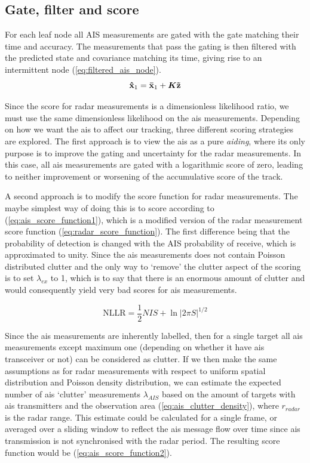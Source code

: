 \subsection{Gate, filter and score}\label{sec:ais_gate_filter_score}
For each leaf node all AIS measurements are gated with the gate matching their time and accuracy. The measurements that pass the gating is then filtered with the predicted state and covariance matching its time, giving rise to an intermittent node (\ref{eq:filtered_ais_node}).
\begin{equation}\label{eq:filtered_ais_node}
\boldsymbol{\mathbf{\hat{x}}}_1 = \boldsymbol{\mathbf{\bar{x}}}_1 + \bm{K} \boldsymbol{\mathbf{\tilde{z}}}
\end{equation}

Since the score for radar measurements is a dimensionless likelihood ratio, we must use the same dimensionless likelihood on the \gls{ais} measurements. Depending on how we want the \gls{ais} to affect our tracking, three different scoring strategies are explored. The first approach is to view the \gls{ais} as a pure \emph{aiding}, where its only purpose is to improve the gating and uncertainty for the radar measurements. In this case, all \gls{ais} measurements are gated with a logarithmic score of zero, leading to neither improvement or worsening of the accumulative score of the track.

A second approach is to modify the score function for radar measurements. The maybe simplest way of doing this is to score according to (\ref{eq:ais_score_function1}), which is a modified version of the radar measurement score function (\ref{eq:radar_score_function}). The first difference being that the probability of detection is changed with the AIS probability of receive, which is approximated to unity. Since the \gls{ais} measurements does not contain Poisson distributed clutter and the only way to `remove' the clutter aspect of the scoring is to set \( \lambda_{ex} \) to 1, which is to say that there is an enormous amount of clutter and would consequently yield very bad scores for \gls{ais} measurements.

\begin{equation}\label{eq:ais_score_function1}
\mathrm{NLLR} = \frac{1}{2} NIS + \ln |2 \pi S|^{1/2} 
\end{equation}

Since the \gls{ais} measurements are inherently labelled, then for a single target all \gls{ais} measurements except maximum one (depending on whether it have \gls{ais} transceiver or not) can be considered as clutter. If we then make the same assumptions as for radar measurements with respect to uniform spatial distribution and Poisson density distribution, we can estimate the expected number of \gls{ais} `clutter' measurements \( \lambda_{AIS} \) based on the amount of targets with \gls{ais} transmitters and the observation area (\ref{eq:ais_clutter_density}), where \(r_{radar}\) is the radar range. This estimate could be calculated for a single frame, or averaged over a sliding window to reflect the \gls{ais} message flow over time since \gls{ais} transmission is not synchronised with the radar period. The resulting score function would be (\ref{eq:ais_score_function2}).

